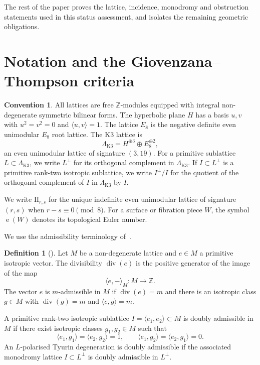 \documentclass[12pt]{article}
\theoremstyle{plain}
\theoremstyle{definition}
\newtheorem{definition}[theorem]{Definition}
\newtheorem{convention}[theorem]{Convention}
\DeclareMathOperator{\divis}{div}
\DeclareMathOperator{\eul}{e}
\newcommand{\bZ}{\mathbb{Z}}
\newcommand{\LambdaK}{\Lambda_{\mathrm{K3}}}
\begin{document}
The rest of the paper proves the lattice, incidence, monodromy and obstruction statements used in this status assessment, and isolates the remaining geometric obligations.

\section{Notation and the Giovenzana--Thompson criteria}

\begin{convention}\label{conv:lattices}
All lattices are free $\bZ$-modules equipped with integral non-degenerate symmetric bilinear forms.  The hyperbolic plane $H$ has a basis $u,v$ with $u^2=v^2=0$ and $\langle u,v\rangle=1$.  The lattice $E_8$ is the negative definite even unimodular $E_8$ root lattice.  The K3 lattice is
\[
\LambdaK = H^{\oplus 3}\oplus E_8^{\oplus 2},
\]
an even unimodular lattice of signature $(3,19)$.  For a primitive sublattice $L\subset \LambdaK$, we write $L^\perp$ for its orthogonal complement in $\LambdaK$.  If $I\subset L^\perp$ is a primitive rank-two isotropic sublattice, we write $I^\perp/I$ for the quotient of the orthogonal complement of $I$ in $\LambdaK$ by $I$.

We write $\mathrm{II}_{r,s}$ for the unique indefinite even unimodular lattice of signature $(r,s)$ when $r-s\equiv 0\pmod 8$.  For a surface or fibration piece $W$, the symbol $\eul(W)$ denotes its topological Euler number.
\end{convention}

We use the admissibility terminology of~\cite{GT24}.

\begin{definition}[{\cite[Definitions~3.30 and 3.31]{GT24}}]
Let $M$ be a non-degenerate lattice and $e\in M$ a primitive isotropic vector.  The divisibility $\divis(e)$ is the positive generator of the image of the map
\[
\langle e,-\rangle_M\colon M\to \bZ.
\]
The vector $e$ is $m$-admissible in $M$ if $\divis(e)=m$ and there is an isotropic class $g\in M$ with $\divis(g)=m$ and $\langle e,g\rangle=m$.

A primitive rank-two isotropic sublattice $I=\langle e_1,e_2\rangle\subset M$ is doubly admissible in $M$ if there exist isotropic classes $g_1,g_2\in M$ such that
\[
\langle e_1,g_1\rangle=\langle e_2,g_2\rangle=1,
\qquad
\langle e_1,g_2\rangle=\langle e_2,g_1\rangle=0.
\]
An $L$-polarised Tyurin degeneration is doubly admissible if the associated monodromy lattice $I\subset L^\perp$ is doubly admissible in $L^\perp$.
\end{definition}
\end{document}
